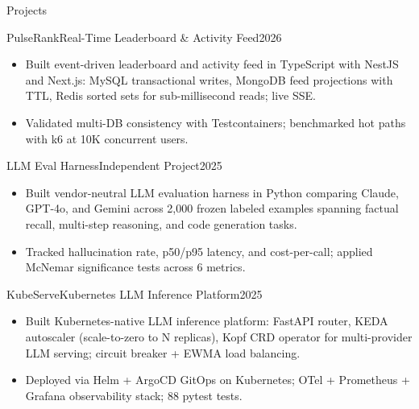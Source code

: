 \documentclass[]{mcdowellcv}
\begin{document}
\begin{cvsection}{Projects}
  \begin{cvsubsection}{PulseRank}{Real-Time Leaderboard \& Activity Feed}{2026}
    \begin{itemize}
      \item Built event-driven leaderboard and activity feed in TypeScript with NestJS and Next.js: MySQL transactional writes, MongoDB feed projections with TTL, Redis sorted sets for sub-millisecond reads; live SSE.
      \item Validated multi-DB consistency with Testcontainers; benchmarked hot paths with k6 at 10K concurrent users.
    \end{itemize}
    \vspace{-1.5pt}
  \end{cvsubsection}

  \begin{cvsubsection}{LLM Eval Harness}{Independent Project}{2025}
    \begin{itemize}
      \item Built vendor-neutral LLM evaluation harness in Python comparing Claude, GPT-4o, and Gemini across 2,000 frozen labeled examples spanning factual recall, multi-step reasoning, and code generation tasks.
      \item Tracked hallucination rate, p50/p95 latency, and cost-per-call; applied McNemar significance tests across 6 metrics.
    \end{itemize}
    \vspace{-1.5pt}
  \end{cvsubsection}

  \begin{cvsubsection}{KubeServe}{Kubernetes LLM Inference Platform}{2025}
    \begin{itemize}
      \item Built Kubernetes-native LLM inference platform: FastAPI router, KEDA autoscaler (scale-to-zero to N replicas), Kopf CRD operator for multi-provider LLM serving; circuit breaker + EWMA load balancing.
      \item Deployed via Helm + ArgoCD GitOps on Kubernetes; OTel + Prometheus + Grafana observability stack; 88 pytest tests.
    \end{itemize}
    \vspace{-1.5pt}
  \end{cvsubsection}
\end{cvsection}
\end{document}
